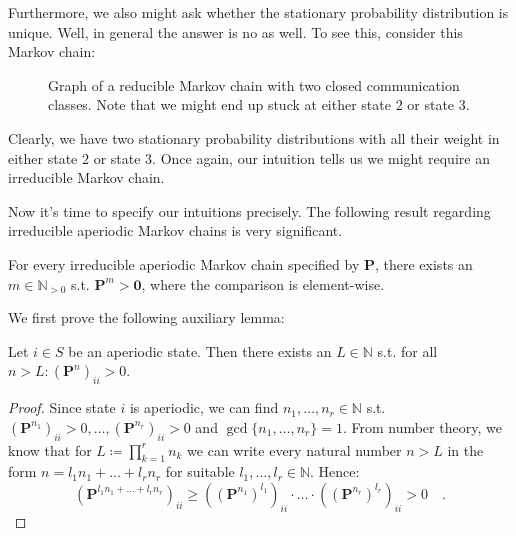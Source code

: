 \documentclass[../../main.tex]{subfiles}
\begin{document}
Furthermore, we also might ask whether the stationary probability distribution is unique. Well, in general the answer is no as well. To see this, consider this Markov chain:

\begin{figure}[h]
    \center
    \caption{Graph of a reducible Markov chain with two closed communication classes. Note that we might end up stuck at either state $2$ or state $3$.}
    \label{fig:markov_chain_two_closed_classes}
\end{figure}

Clearly, we have two stationary probability distributions with all their weight in either state $2$ or state $3$. Once again, our intuition tells us we might require an irreducible Markov chain.

Now it's time to specify our intuitions precisely. The following result regarding irreducible aperiodic Markov chains is very significant.

\begin{theorem}
    For every irreducible aperiodic Markov chain specified by $\bm{P}$, there exists an $m \in \mathbb{N}_{>0}$ s.t. $\bm{P}^m > \bm{0}$, where the comparison is element-wise.
    \label{theorem:positive_transition_matrix}
\end{theorem}

We first prove the following auxiliary lemma:

\begin{lemma}
    Let $i \in S$ be an aperiodic state. Then there exists an $L \in \mathbb{N}$ s.t. for all $n > L: (\bm{P}^n)_{ii} > 0$.
    \label{lemma:aux}
\end{lemma}
\vspace{-2.5em}
\begin{proof}
    Since state $i$ is aperiodic, we can find $n_1, \dots, n_r \in \mathbb{N}$ s.t. $(\bm{P}^{n_1})_{ii} > 0, \dots, (\bm{P}^{n_r})_{ii} > 0$ and $\gcd \{ n_1, \dots , n_r \} = 1$. From number theory, we know that for $L \coloneqq \prod_{k=1}^{r} n_k$ we can write every natural number $n > L$ in the form $n = l_1 n_1 + \dots + l_r n_r$ for suitable $l_1, \dots, l_r \in \mathbb{N}$. Hence:
    \[
        (\bm{P}^{l_1 n_1 + \dots + l_r n_r})_{ii} \geq ((\bm{P}^{n_1})^{l_1})_{ii} \cdot \dots \cdot ((\bm{P}^{n_r})^{l_r})_{ii} > 0 \quad .
    \]
\end{proof}
\end{document}
